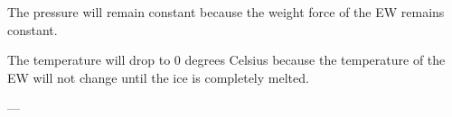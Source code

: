 The pressure will remain constant because the weight force of the EW remains constant.  

The temperature will drop to 0 degrees Celsius because the temperature of the EW will not change until the ice is completely melted.  

---